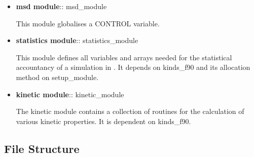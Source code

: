 \begin{itemize}
\item {\bf msd module}:: {\sc msd\_module}

This module globalises a CONTROL variable.

\item {\bf statistics module}:: {\sc statistics\_module}

This module defines all variables and arrays needed for the
statistical accountancy of a simulation in \D.  It depends on {\sc
kinds\_f90} and its allocation method on {\sc setup\_module}.

\item {\bf kinetic module}:: {\sc kinetic\_module}

The kinetic module contains a collection of routines for the
calculation of various kinetic properties.
It is dependent on {\sc kinds\_f90}.

\end{itemize}

\subsection{File Structure}
\label{file-structure}

